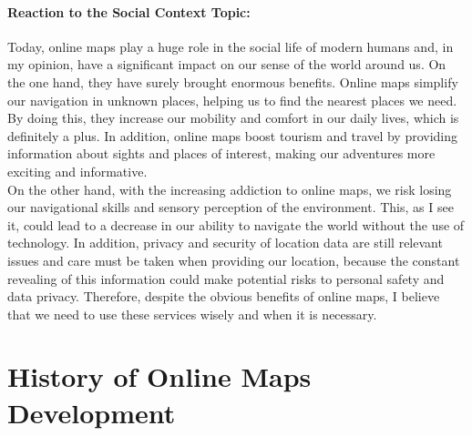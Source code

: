 \documentclass[10pt,oneside,english,a4paper]{article}
\begin{document}
\paragraph{Reaction to the Social Context Topic:}
Today, online maps play a huge role in the social life of modern humans and, in my opinion, have a significant impact on our sense of the world around us. On the one hand, they have surely brought enormous benefits. Online maps simplify our navigation in unknown places, helping us to find the nearest places we need. By doing this, they increase our mobility and comfort in our daily lives, which is definitely a plus. In addition, online maps boost tourism and travel by providing information about sights and places of interest, making our adventures more exciting and informative. 
\\On the other hand, with the increasing addiction to online maps, we risk losing our navigational skills and sensory perception of the environment. This, as I see it, could lead to a decrease in our ability to navigate the world without the use of technology. In addition, privacy and security of location data are still relevant issues and care must be taken when providing our location, because the constant revealing of this information could make potential risks to personal safety and data privacy. Therefore, despite the obvious benefits of online maps, I believe that we need to use these services wisely and when it is necessary.

\section{History of Online Maps Development} \label{history}
\end{document}
